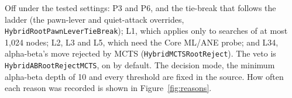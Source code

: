 \documentclass{article}
\begin{document}
Off under the tested settings: P3 and P6, and the tie-break that follows the ladder (the pawn-lever and quiet-attack overrides, \texttt{HybridRootPawnLeverTieBreak}); L1, which applies only to searches of at most 1{,}024 nodes; L2, L3 and L5, which need the Core ML/ANE probe; and L34, alpha-beta's move rejected by MCTS (\texttt{HybridMCTSRootReject}). The veto is \texttt{HybridABRootRejectMCTS}, on by default. The decision mode, the minimum alpha-beta depth of 10 and every threshold are fixed in the source. How often each reason was recorded is shown in Figure~\ref{fig:reasons}.
\end{document}

